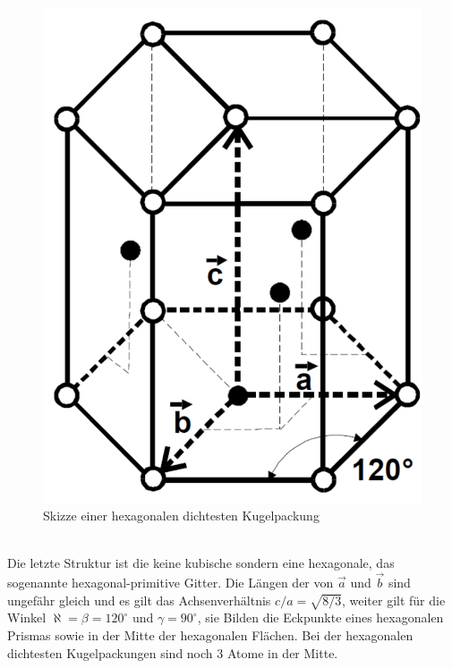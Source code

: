 \begin{figure}[h!]
	\centering
	\includegraphics[scale=0.2]{../Grafiken/HexagonalesGitter.pdf}
	\caption{Skizze einer hexagonalen dichtesten Kugelpackung}
\end{figure}\\
Die letzte Struktur ist die keine kubische sondern eine hexagonale, das sogenannte hexagonal-primitive Gitter. Die Längen der von $\vec{a}$ und $\vec{b}$ sind ungefähr gleich und es gilt das Achsenverhältnis $c/a=\sqrt{8/3}$, weiter gilt für die Winkel $\aleph=\beta=120^\circ$ und $\gamma=90^\circ$, sie Bilden die Eckpunkte eines hexagonalen Prismas sowie in der Mitte der hexagonalen Flächen. Bei der hexagonalen dichtesten Kugelpackungen sind noch 3 Atome in der Mitte. 

